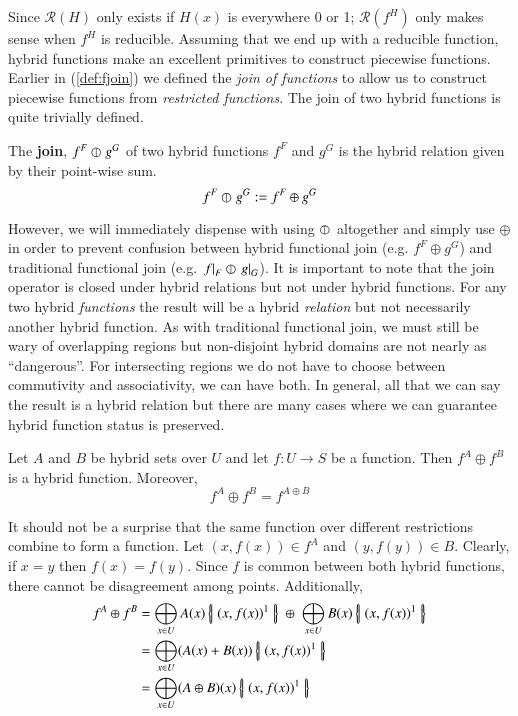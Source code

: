 Since $\mathcal{R}(H)$ only exists if $H(x)$ is everywhere 0 or 1; 
$\mathcal{R}(f^H)$ only makes sense when $f^H$ is reducible.
Assuming that we end up with a reducible function, hybrid functions make an excellent primitives to construct piecewise functions.
Earlier in (\ref{def:fjoin}) we defined the \emph{join of functions} to allow us to construct piecewise functions from \emph{restricted functions}.
The join of two hybrid functions is quite trivially defined.

 
\begin{definition}
	The \textbf{join}, $f^F \varobar^{} g^G$ of two hybrid functions $f^F$ and $g^G$ is 
	the hybrid relation given by their point-wise sum.
	\begin{equation} \label{def:hjoin}
		f^F \varobar^{} g^G := f^F \oplus g^G
	\end{equation}
\end{definition}


However, we will immediately dispense with using $\varobar^{}$ altogether and simply use $\oplus$ 
in order to prevent confusion between hybrid functional join (e.g. $f^F \oplus g^G$) and 
traditional functional join (e.g. $\left.f\right|_{F} \varobar \left.g\right|_{G}$).
It is important to note that the join operator is closed under hybrid relations but not under hybrid functions.
For any two hybrid \emph{functions} the result will be a hybrid \emph{relation} 
but not necessarily another hybrid function.
As with traditional functional join, we must still be wary of overlapping regions
 but non-disjoint hybrid domains are not nearly as ``dangerous''.
For intersecting regions we do not have to choose between commutivity and associativity, we can have both.
In general, all that we can say the result is a hybrid relation but there are many cases where we can guarantee hybrid function status is preserved.


\begin{theorem}
\label{thm:reducible1}
Let $A$ and $B$ be hybrid sets over $U$ and let $f: U \to S$ be a function.
Then $f^A \oplus f^B$ is a hybrid function.
Moreover,
	\begin{equation}
		f^A \oplus f^B = f^{A \oplus B}
	\end{equation}
\end{theorem}


It should not be a surprise that the same function over different restrictions combine to form a function.
Let $(x,f(x)) \in f^A$ and $(y,f(y)) \in B$. Clearly, if $x=y$ then $f(x)=f(y)$. 
Since $f$ is common between both hybrid functions, there cannot be disagreement among points.
Additionally,
\begin{align}
	f^A \oplus f^B 
		&= \bigoplus_{x \in U} A(x) \hset{ (x, f(x) )^1 } 
			\; \oplus \; \bigoplus_{x \in U} B(x) \hset{ (x, f(x) )^1 } \notag \\
		&= \bigoplus_{x \in U} (A(x) + B(x)) \hset{ (x, f(x) )^1 } \notag \\
		&= \bigoplus_{x \in U} (A \oplus B)(x) \hset{ (x, f(x) )^1 }
\end{align}


